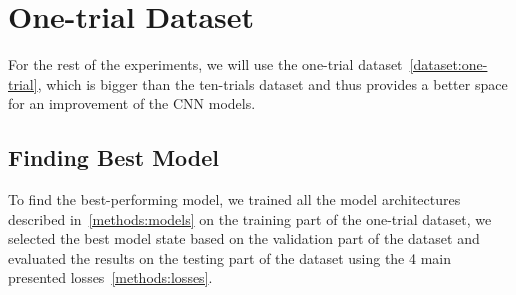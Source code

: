 \section{One-trial Dataset}
\label{experiments:one-trial}
For the rest of the experiments, we will use the one-trial dataset~\ref{dataset:one-trial}, which is bigger than the ten-trials dataset and thus provides a better space for an improvement of the CNN models.




\subsection{Finding Best Model}
\label{experiments:one-trial:finding-best-model}
To find the best-performing model, we trained all the model architectures described in~\ref{methods:models} on the training part of the one-trial dataset, we selected the best model state based on the validation part of the dataset and evaluated the results on the testing part of the dataset using the 4 main presented losses~\ref{methods:losses}.


